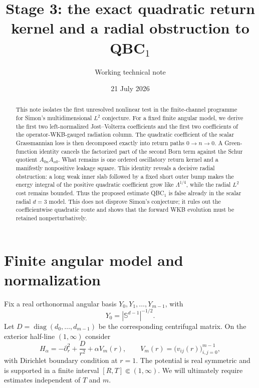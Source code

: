 \documentclass[11pt]{article}
\title{Stage 3: the exact quadratic return kernel and a radial obstruction to QBC$_1$}
\author{Working technical note}
\date{21 July 2026}
\newcommand{\Sd}{\mathbb S^{d-1}}
\theoremstyle{definition}
\begin{document}
\maketitle

\begin{abstract}
This note isolates the first unresolved nonlinear test in the finite-channel programme for Simon's multidimensional $L^2$ conjecture.  For a fixed finite angular model, we derive the first two left-normalized Jost--Volterra coefficients and the first two coefficients of the operator-WKB-gauged radiation column.  The quadratic coefficient of the scalar Grassmannian loss is then decomposed exactly into return paths $0\to n\to0$.  A Green-function identity cancels the factorized part of the second Born term against the Schur quotient $A_{0n}A_{n0}$.  What remains is one ordered oscillatory return kernel and a manifestly nonpositive leakage square.  This identity reveals a decisive radial obstruction: a long weak inner slab followed by a fixed short outer bump makes the energy integral of the positive quadratic coefficient grow like $\Lambda^{1/4}$, while the radial $L^2$ cost remains bounded.  Thus the proposed estimate QBC$_1$ is false already in the scalar radial $d=3$ model.  This does not disprove Simon's conjecture; it rules out the coefficientwise quadratic route and shows that the forward WKB evolution must be retained nonperturbatively.
\end{abstract}

\noindent
{}

\section{Finite angular model and normalization}

Fix a real orthonormal angular basis $Y_0,Y_1,\dots,Y_{m-1}$, with
\begin{equation}
 Y_0=|\Sd|^{-1/2}.
\end{equation}
Let $D=\operatorname{diag}(d_0,\dots,d_{m-1})$ be the corresponding centrifugal matrix.  On the exterior half-line $(1,\infty)$ consider
\begin{equation}
 H_{\alpha}=-\partial_r^2+\frac{D}{r^2}+\alpha V_m(r),
 \qquad
 V_m(r)=\bigl(v_{ij}(r)\bigr)_{i,j=0}^{m-1},
 \label{eq:finite-model}
\end{equation}
with Dirichlet boundary condition at $r=1$.  The potential is real symmetric and is supported in a finite interval $[R,T]\Subset(1,\infty)$.  We will ultimately require estimates independent of $T$ and $m$.
\end{document}

